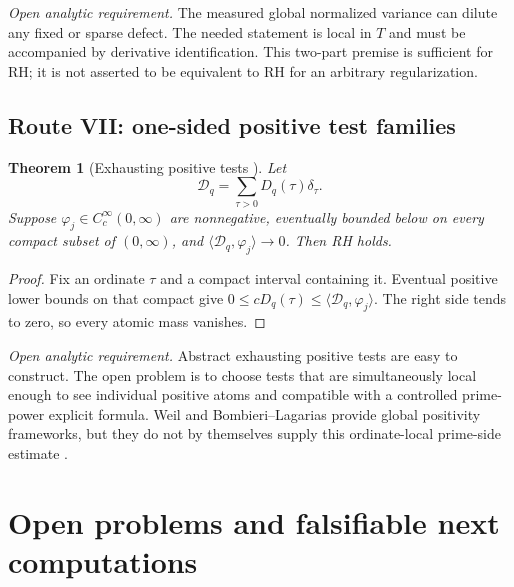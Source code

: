 \documentclass[11pt]{amsart}
\numberwithin{equation}{section}
\theoremstyle{plain}
\newtheorem{theorem}{Theorem}[section]
\theoremstyle{definition}
\theoremstyle{remark}
\newcommand{\1}{\mathbf{1}}
\begin{document}
\medskip\noindent\emph{Open analytic requirement.} The measured global normalized variance can dilute any fixed or
sparse defect.  The needed statement is local in $T$ and must be accompanied
by derivative identification.  This two-part premise is sufficient for RH;
it is not asserted to be equivalent to RH for an arbitrary regularization.

\subsection{Route VII: one-sided positive test families}
\label{subsec:route_positive_tests}


\begin{theorem}[Exhausting positive tests {}]
\label{thm:exhausting_positive_tests}
Let
\begin{equation}
\mathcal D_q=\sum_{\tau>0}D_q(\tau)\delta_\tau.
\label{eq:positive_defect_measure_route}
\end{equation}
Suppose $\varphi_j\in C_c^\infty(0,\infty)$ are nonnegative, eventually
bounded below on every compact subset of $(0,\infty)$, and
$\langle\mathcal D_q,\varphi_j\rangle\to0$.  Then RH holds.
\end{theorem}

\begin{proof}
Fix an ordinate $\tau$ and a compact interval containing it.  Eventual
positive lower bounds on that compact give
$0\leq cD_q(\tau)\leq\langle\mathcal D_q,\varphi_j\rangle$.  The right side
tends to zero, so every atomic mass vanishes.
\end{proof}

\medskip\noindent\emph{Open analytic requirement.} Abstract exhausting positive tests are easy to construct.  The
open problem is to choose tests that are simultaneously local enough to see
individual positive atoms and compatible with a controlled prime-power
explicit formula.  Weil and Bombieri--Lagarias provide global positivity
frameworks, but they do not by themselves supply this ordinate-local
prime-side estimate \cite{Weil1952,BombieriLagarias1999}.

\section{Open problems and falsifiable next computations}
\label{sec:open_problems}
\end{document}
